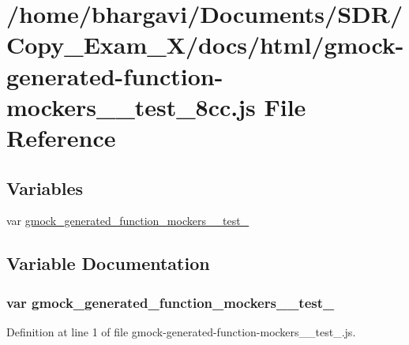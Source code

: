 \hypertarget{gmock-generated-function-mockers____test__8cc_8js}{}\section{/home/bhargavi/\+Documents/\+S\+D\+R/\+Copy\+\_\+\+Exam\+\_\+X/docs/html/gmock-\/generated-\/function-\/mockers\+\_\+\+\_\+test\+\_\+8cc.js File Reference}
\label{gmock-generated-function-mockers____test__8cc_8js}
\subsection*{Variables}
\begin{DoxyCompactItemize}
\item 
var \hyperlink{gmock-generated-function-mockers____test__8cc_8js_a78e3202d81427bc9d38affda9ff42c57}{gmock\+\_\+generated\+\_\+function\+\_\+mockers\+\_\+\+\_\+test\+\_}
\end{DoxyCompactItemize}


\subsection{Variable Documentation}
\subsubsection[{\texorpdfstring{gmock\+\_\+generated\+\_\+function\+\_\+mockers\+\_\+\+\_\+test\+\_\+8cc}{gmock_generated_function_mockers__test_8cc}}]{\setlength{\rightskip}{0pt plus 5cm}var gmock\+\_\+generated\+\_\+function\+\_\+mockers\+\_\+\+\_\+test\+\_}\hypertarget{gmock-generated-function-mockers____test__8cc_8js_a78e3202d81427bc9d38affda9ff42c57}{}\label{gmock-generated-function-mockers____test__8cc_8js_a78e3202d81427bc9d38affda9ff42c57}


Definition at line 1 of file gmock-\/generated-\/function-\/mockers\+\_\+\+\_\+test\+\_.\+js.

